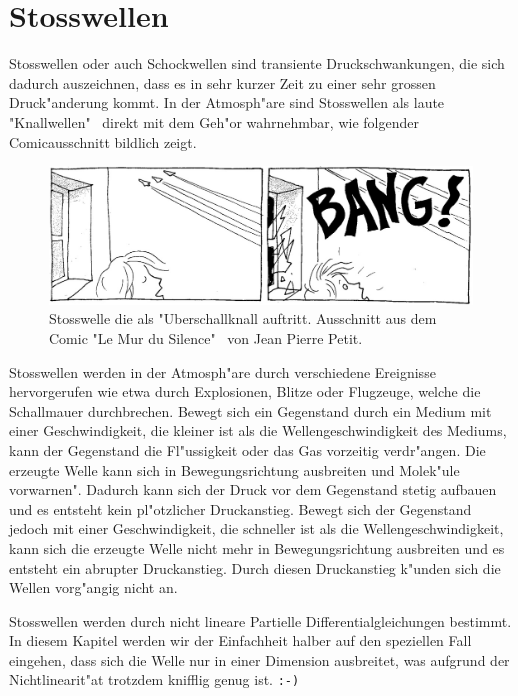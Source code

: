 \chapter{Stosswellen}
\begin{refsection}


Stosswellen oder auch Schockwellen sind transiente Druckschwankungen,
die sich dadurch auszeichnen, dass es in sehr kurzer Zeit zu einer sehr
grossen Druck"anderung kommt.
In der Atmosph"are sind Stosswellen als laute "Knallwellen" \, direkt
mit dem Geh"or wahrnehmbar, wie folgender Comicausschnitt bildlich zeigt.
\begin{figure}[h]
\begin{center}
\includegraphics[width=\hsize]{stosswellen/ueberschall.jpg}
\end{center}
\caption{Stosswelle die als "Uberschallknall auftritt. Ausschnitt aus dem Comic "Le Mur du Silence" \, von Jean Pierre Petit\cite{stoss:leMurDeSilence}.}
\label{stosswellen:ueberschall}
\end{figure}

Stosswellen werden in der Atmosph"are durch verschiedene Ereignisse
hervorgerufen wie etwa durch Explosionen, Blitze oder Flugzeuge,
welche die Schallmauer durchbrechen. Bewegt sich ein Gegenstand
durch ein Medium mit einer Geschwindigkeit, die kleiner ist als die
Wellengeschwindigkeit des Mediums, kann der Gegenstand die Fl"ussigkeit
oder das Gas vorzeitig verdr"angen. Die erzeugte Welle kann sich in
Bewegungsrichtung ausbreiten und Molek"ule \grqq vorwarnen". Dadurch
kann sich der Druck vor dem Gegenstand stetig aufbauen und es entsteht
kein pl"otzlicher Druckanstieg. Bewegt sich der Gegenstand jedoch mit
einer Geschwindigkeit, die schneller ist als die Wellengeschwindigkeit,
kann sich die erzeugte Welle nicht mehr in Bewegungsrichtung ausbreiten
und es entsteht ein abrupter Druckanstieg. Durch diesen Druckanstieg
k"unden sich die Wellen vorg"angig nicht an.

Stosswellen werden durch nicht lineare Partielle Differentialgleichungen
bestimmt. In diesem Kapitel werden wir der Einfachheit halber auf den
speziellen Fall eingehen, dass sich die Welle nur in einer Dimension
ausbreitet, was aufgrund der Nichtlinearit"at trotzdem knifflig genug
ist. {\tt :-)}\\


\end{refsection}
